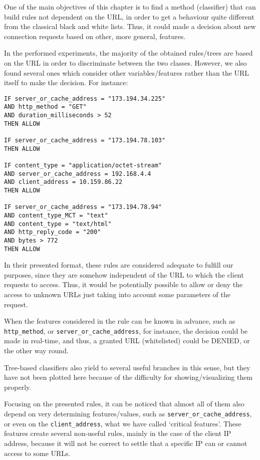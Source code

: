 \documentclass{llncs}
\begin{document}
One of the main objectives of this chapter is to find a method (classifier) that can build rules not dependent on the URL, in order to get a behaviour quite different from the classical black and white lists. Thus, it could made a decision about new connection requests based on other, more general, features.

In the performed experiments, the majority of the obtained rules/trees are based on the URL in order to discriminate between the two classes. However, we also found several ones which consider other variables/features rather than the URL itself to make the decision. For instance:\\

\begin{small}
\begin{verbatim}
IF server_or_cache_address = "173.194.34.225"
AND http_method = "GET"
AND duration_milliseconds > 52
THEN ALLOW

IF server_or_cache_address = "173.194.78.103"
THEN ALLOW

IF content_type = "application/octet-stream" 
AND server_or_cache_address = 192.168.4.4 
AND client_address = 10.159.86.22
THEN ALLOW

IF server_or_cache_address = "173.194.78.94"
AND content_type_MCT = "text"
AND content_type = "text/html"
AND http_reply_code = "200"
AND bytes > 772
THEN ALLOW
\end{verbatim}
\end{small}

In their presented format, these rules are considered adequate to fulfill our purposes, since they are somehow independent of the URL to which the client requests to access. Thus, it would be potentially possible to allow or deny the access to unknown URLs just taking into account some parameters of the request.

When the features considered in the rule can be known in advance, such as \texttt{http\_method}, or \texttt{server\_or\_cache\_address}, for instance, the decision could be made in real-time, and thus, a granted URL (whitelisted) could be DENIED, or the other way round.

Tree-based classifiers also yield to several useful branches in this sense, but they have not been plotted here because of the difficulty for showing/visualizing them properly.

Focusing on the presented rules, it can be noticed that almost all of them also depend on very determining features/values, such as \texttt{server\_or\_cache\_address}, or even on the \texttt{client\_address}, what we have called `critical features'. These features create several non-useful rules, mainly in the case of the client IP address, because it will not be correct to settle that a specific IP can or cannot access to some URLs. 
\end{document}

